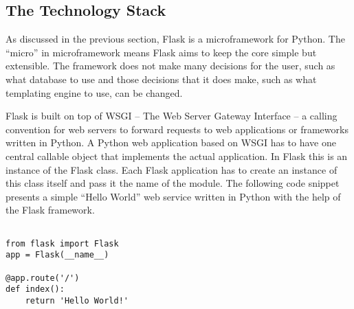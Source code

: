 


\subsection{The Technology Stack}
\label{sec:flask}

 As discussed in the previous section, Flask is a microframework for Python. 
 The ``micro'' in microframework means Flask aims to keep the core simple but extensible. 
 The framework does not make many decisions for the user, such as what database to use and
 those decisions that it does make, such as what templating engine to use, can be changed. 

 Flask is built on top of WSGI -- The Web Server Gateway Interface -- a calling convention for web servers to forward requests to web applications or frameworks written in Python. A Python web application based on WSGI has to have one central callable object that implements the actual application. In Flask this is an instance of the Flask class. Each Flask application has to create an instance of this class itself and pass it the name of the module. The following code snippet presents a simple ``Hello World'' web service written in Python with the help of the Flask framework. 

\begin{lstlisting}[style=custompython]

from flask import Flask
app = Flask(__name__)

@app.route('/')
def index():
    return 'Hello World!'

\end{lstlisting}




